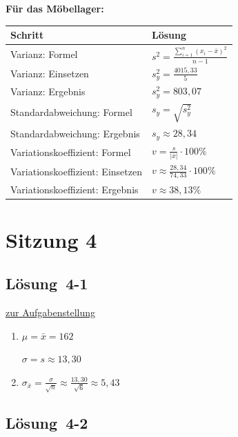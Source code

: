\documentclass[
  11pt,
  ngerman,
  a4paper,
]{report}
\begin{document}
\textbf{Für das Möbellager:}

\begin{table}[H]
\centering
\begin{tabular}{ll}
\toprule
\textbf{Schritt} & \textbf{Lösung}\\
\midrule
Varianz: Formel & $s^2=\frac{\sum\limits_{i=1}^{n}(x_{i}-\bar{x})^2}{n-1}$\\
Varianz: Einsetzen & $s^2_y=\frac{4015{,}33}{5}$\\
Varianz: Ergebnis & $s^2_y=803{,}07$\\
Standardabweichung: Formel & $s_y=\sqrt{s^2_y}$\\
Standardabweichung: Ergebnis & $s_y\approx28{,}34$\\
Variationskoeffizient: Formel & $v=\frac{s}{|\bar{x}|}\cdot100\%$\\
Variationskoeffizient: Einsetzen & $v\approx\frac{28{,}34}{74{,}33}\cdot100\%$\\
Variationskoeffizient: Ergebnis & $v \approx 38{,}13\%$\\
\bottomrule
\end{tabular}
\end{table}

\hypertarget{sitzung-4}{%
\section*{Sitzung 4}\label{sitzung-4}}

\hypertarget{loesung-4-1}{%
\subsection{Lösung~4-1}\label{loesung-4-1}}

\protect\hyperlink{aufgabe-4-1}{zur Aufgabenstellung}

\begin{enumerate}
\def\labelenumi{\alph{enumi})}
\item
  \(\mu = \bar{x} = 162\)

  \(\sigma = s \approx 13{,}30\)
\item
  \(\sigma_{\bar{x}} = \frac{\sigma}{\sqrt{n}}\approx\frac{13{,}30}{\sqrt{6}} \approx 5,43\)
\end{enumerate}

\hypertarget{loesung-4-2}{%
\subsection{Lösung~4-2}\label{loesung-4-2}}
\end{document}
